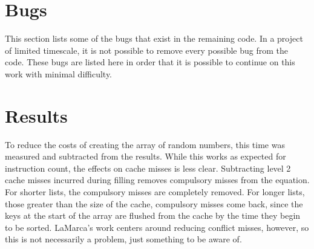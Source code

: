 \section{Bugs}
This section lists some of the bugs that exist in the remaining code. In a
project of limited timescale, it is not possible to remove every possible bug
from the code. These bugs are listed here in order that it is possible to
continue on this work with minimal difficulty.

\section{Results}
\label{bug3}
To reduce the costs of creating the array of random numbers, this time was
measured and subtracted from the results. While this works as expected for
instruction count, the effects on cache misses is less clear. Subtracting level
2 cache misses incurred during filling removes compulsory misses from the
equation. For shorter lists, the compulsory misses are completely removed.
For longer lists, those greater than the size of the cache, compulsory misses
come back, since the keys at the start of the array are flushed from the cache
by the time they begin to be sorted. LaMarca's work centers around
reducing conflict misses, however, so this is not necessarily a problem, just
something to be aware of.
